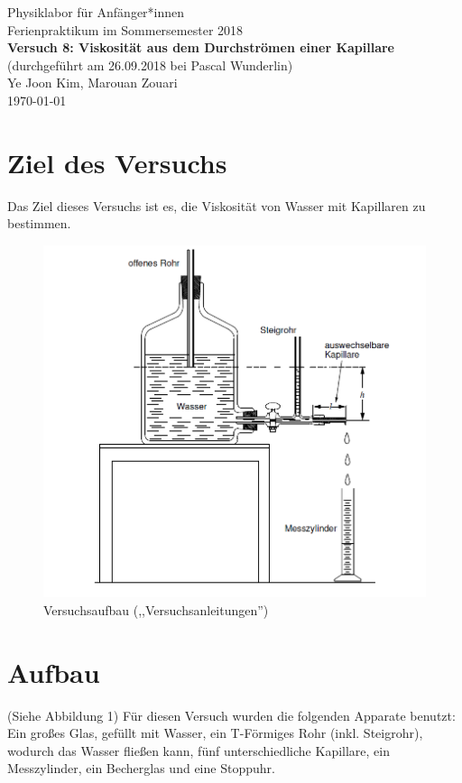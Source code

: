 \documentclass[11pt,a4paper]{article}
\begin{document}
	

{
	\centering 
	\large 
	Physiklabor für Anfänger*innen \\
	Ferienpraktikum im Sommersemester 2018 \\[4mm]
	\textbf{\LARGE 
		Versuch 8: Viskosität aus dem Durchströmen einer Kapillare
	} \\[3mm]
	(durchgeführt am 26.09.2018 bei Pascal Wunderlin) \\
	Ye Joon Kim, Marouan Zouari\\
	\today \\[10mm]
}
\tableofcontents
\section{Ziel des Versuchs}
Das Ziel dieses Versuchs ist es, die Viskosität von Wasser mit Kapillaren zu bestimmen. 

\begin{figure}
	\centering
	\includegraphics[scale=0.5]{pro8}
	\caption { Versuchsaufbau (,,Versuchsanleitungen'') }
\end{figure}
\section{Aufbau}
(Siehe Abbildung 1)
Für diesen Versuch wurden die folgenden Apparate benutzt: Ein großes Glas, gefüllt mit Wasser, ein T-Förmiges Rohr (inkl. Steigrohr), wodurch das Wasser fließen kann, fünf unterschiedliche Kapillare, ein Messzylinder, ein Becherglas und eine Stoppuhr. 
\end{document}
